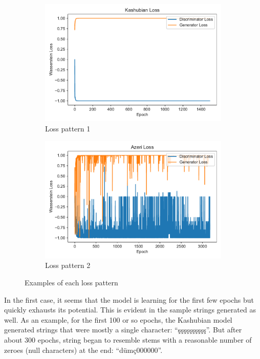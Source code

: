 \documentclass{article}
\begin{document}
      \begin{figure}[H]
        \centering
        \begin{subfigure}{.5\textwidth}
          \centering
          \includegraphics[width=0.8\linewidth]{loss_plots/kashubian.pdf}
          \caption{Loss pattern 1}
          \label{fig:kashubianloss}
        \end{subfigure}%
        \begin{subfigure}{.5\textwidth}
          \centering
          \includegraphics[width=0.8\linewidth]{loss_plots/azeri.pdf}
          \caption{Loss pattern 2}
          \label{fig:azeriloss}
        \end{subfigure}
        \caption{Examples of each loss pattern}
        \label{fig:loss}
      \end{figure}
      
      In the first case, it seems that the model is learning for the first few epochs but quickly exhausts its potential. This is evident in the sample strings generated as well. As an example, for the first 100 or so epochs, the Kashubian model generated strings that were mostly a single character: ``şşşşşşşşşş''. But after about 300 epochs, string began to resemble stems with a reasonable number of zeroes (null characters) at the end: ``dümç000000''.
\end{document}
